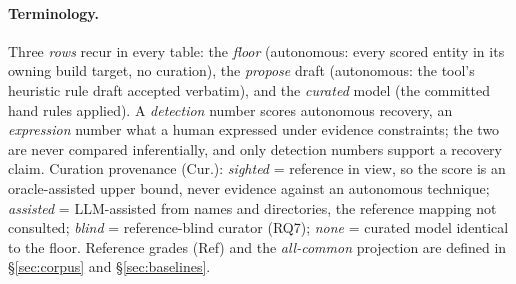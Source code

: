 \paragraph{Terminology.}
Three \emph{rows} recur in every table: the \emph{floor} (autonomous: every scored entity in its
owning build target, no curation), the \emph{propose} draft (autonomous: the tool's heuristic rule
draft accepted verbatim), and the \emph{curated} model (the committed hand rules applied). A
\emph{detection} number scores autonomous recovery, an \emph{expression} number what a human
expressed under evidence constraints; the two are never compared inferentially, and only detection
numbers support a recovery claim. Curation provenance (Cur.): \emph{sighted} = reference in view,
so the score is an oracle-assisted upper bound, never evidence against an autonomous technique;
\emph{assisted} = LLM-assisted from names and directories, the reference mapping not consulted;
\emph{blind} = reference-blind curator (RQ7); \emph{none} = curated model identical to the floor.
Reference grades (Ref) and the \emph{all-common} projection are defined in
\S\ref{sec:corpus} and \S\ref{sec:baselines}.
